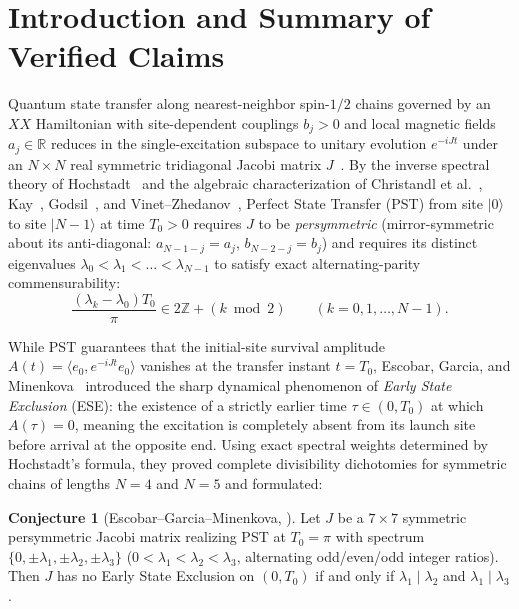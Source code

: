 \documentclass[11pt,reqno]{amsart}
\theoremstyle{definition}
\newtheorem{conjecture}[theorem]{Conjecture}
\newcommand{\R}{\mathbb{R}}
\newcommand{\Z}{\mathbb{Z}}
\begin{document}
\tableofcontents

\section{Introduction and Summary of Verified Claims}
\label{sec:intro}

Quantum state transfer along nearest-neighbor spin-$1/2$ chains governed by an $XX$ Hamiltonian with site-dependent couplings $b_j>0$ and local magnetic fields $a_j\in\R$ reduces in the single-excitation subspace to unitary evolution $e^{-iJt}$ under an $N\times N$ real symmetric tridiagonal Jacobi matrix $J$~\cite{christandl2004,christandl2005,kay2010}. By the inverse spectral theory of Hochstadt~\cite{hochstadt1967,hochstadt1974} and the algebraic characterization of Christandl et al.~\cite{christandl2005}, Kay~\cite{kay2010}, Godsil~\cite{godsil2012}, and Vinet--Zhedanov~\cite{vinet2012}, Perfect State Transfer (PST) from site $|0\rangle$ to site $|N-1\rangle$ at time $T_0>0$ requires $J$ to be \emph{persymmetric} (mirror-symmetric about its anti-diagonal: $a_{N-1-j}=a_j$, $b_{N-2-j}=b_j$) and requires its distinct eigenvalues $\lambda_0<\lambda_1<\dots<\lambda_{N-1}$ to satisfy exact alternating-parity commensurability:
\begin{equation}
\label{eq:pst-cond}
\frac{(\lambda_k - \lambda_0)T_0}{\pi} \in 2\Z + (k \bmod 2) \qquad (k=0,1,\dots,N-1).
\end{equation}

While PST guarantees that the initial-site survival amplitude $A(t) = \langle e_0, e^{-iJt} e_0\rangle$ vanishes at the transfer instant $t=T_0$, Escobar, Garcia, and Minenkova~\cite{escobar2025} introduced the sharp dynamical phenomenon of \emph{Early State Exclusion} (ESE): the existence of a strictly earlier time $\tau\in(0,T_0)$ at which $A(\tau)=0$, meaning the excitation is completely absent from its launch site before arrival at the opposite end. Using exact spectral weights determined by Hochstadt's formula, they proved complete divisibility dichotomies for symmetric chains of lengths $N=4$ and $N=5$ and formulated:

\begin{conjecture}[Escobar--Garcia--Minenkova, {\cite[Conjecture~4.1]{escobar2025}}]
\label{conj:41}
Let $J$ be a $7\times 7$ symmetric persymmetric Jacobi matrix realizing PST at $T_0=\pi$ with spectrum $\{0,\pm\lambda_1,\pm\lambda_2,\pm\lambda_3\}$ ($0<\lambda_1<\lambda_2<\lambda_3$, alternating odd/even/odd integer ratios). Then $J$ has no Early State Exclusion on $(0,T_0)$ if and only if $\lambda_1\mid\lambda_2$ and $\lambda_1\mid\lambda_3$.
\end{conjecture}
\end{document}
